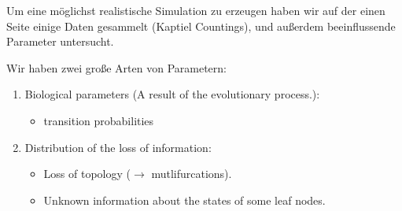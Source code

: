     Um eine möglichst realistische Simulation zu erzeugen haben wir auf der einen Seite einige Daten 
      gesammelt (Kaptiel Countings), und außerdem beeinflussende Parameter untersucht.

    Wir haben zwei große Arten von Parametern:
    \begin{enumerate}
      \item Biological parameters (A result of the evolutionary process.):
        \begin{itemize}
          \item transition probabilities
        \end{itemize}
      \item Distribution of the loss of information:
        \begin{itemize}
          \item Loss of topology ($\rightarrow$ mutlifurcations).
          \item Unknown information about the states of some leaf nodes.
        \end{itemize}
    \end{enumerate}


